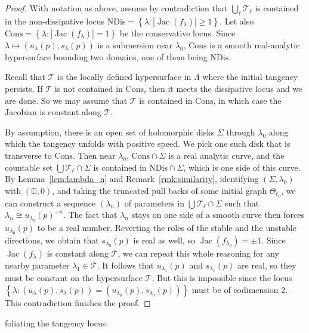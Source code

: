 \documentclass[11pt, oneside]{amsart}
\newcommand{\D}{\mathbb{D}}
\newcommand{\set}[1]{\left\{#1\right\}}
\newcommand{\abs}[1]{\left\vert#1\right\vert}
\newcommand{\la}{\lambda}
\newcommand{\lo}{{\lambda_0}}
\newcommand{\La}{\Lambda}
\DeclareMathOperator{\jac}{Jac}
\theoremstyle{remark}
\theoremstyle{definition}
\theoremstyle{theorem}
\begin{document}
\begin{proof}
With notation as above, 
assume by contradiction that  $\bigcup_\ell \mathcal T_\ell$ is contained in the non-dissipative  
locus $\mathrm{NDis} = \set{\la\colon \abs{\jac(f_\la)} \geq  1}$.
Let also $\mathrm{Cons} =   \set{\la\colon \abs{\jac(f_\la)} =  1}$ be the conservative locus. 
Since $\lambda\mapsto (u_\la(p), s_\la(p))$ is a submersion near $\lo$, 
$\mathrm{Cons}$ is a smooth real-analytic hypersurface bounding two domains, one of them being $\mathrm{NDis}$.  

Recall that $\mathcal T$ is the locally defined  hypersurface in $\La$ 
where the initial tangency persists. 
If $\mathcal T$ is not contained in $\mathrm{Cons}$, then it meets the dissipative locus and we are done. So we may assume that $\mathcal T$ is  contained in 
$\mathrm{Cons}$, in which case the Jacobian is constant along $\mathcal T$. 

By assumption, there is an open  set of holomorphic disks $\Sigma$
through $\la_0$ along which the tangency unfolds with positive speed.  We pick one such   disk 
 that is transverse to $\mathrm{Cons}$. 
 Then near $\lo$,  $\mathrm{Cons}\cap \Sigma$ is a real analytic curve,  
 and  the countable set 
$\bigcup \mathcal T_\ell\cap \Sigma$ is contained in $\mathrm{NDis}\cap \Sigma$, 
which is one side of this curve.  
By Lemma~\ref{lem:lambda_n} and Remark~\ref{rmk:similarity}, identifying  $(\Sigma, \lo)$ with 
$(\D, 0)$, and taking the truncated pull backs of some initial graph $\Theta_{\ell_0}$, 
 we can construct a sequence $(\lambda_n)$ of   parameters in 
$ \bigcup \mathcal T_\ell\cap \Sigma$ such that 
 $\lambda_n\cong u_{\lambda_0}(p)^{-n}$. The fact that 
  $\lambda_n$ stays on one side of a smooth curve
then  forces $u_{\lo}(p)$ to be a real number. Reverting the roles of the stable and the unstable directions, we obtain that $s_{\lo}(p)$ is real as well, so 
 $\jac(f_\lo)=\pm 1$. Since $\jac{(f_\lambda)}$ is constant along $\mathcal T$, 
 we can repeat this whole reasoning for any 
  nearby parameter   $\la_1\in \mathcal T$. It follows  that  $u_{\la_1}(p)$ and $s_{\la_1}(p)$ 
  are real, so they must be constant on the hypersurface $\mathcal T$. But this is impossible
  since the locus $\set{\la: (u_\la(p), s_\la(p)) = (u_\lo(p), s_\lo(p))}$ must be of codimension 2. This 
  contradiction finishes the proof. 
\end{proof}

 \medskip
 
  foliating the tangency locus. 
\end{document}
